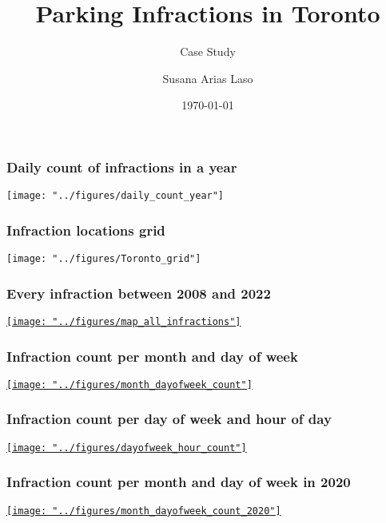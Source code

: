 \documentclass[fleqn]{beamer}
\title[]{Parking Infractions in Toronto}
\subtitle[]{Case Study}
\author[]{Susana Arias Laso}
\date{\today}
\begin{document}
\begin{frame}
  \titlepage

 
\end{frame}

\begin{frame}
\frametitle{Daily count of infractions in a year}
  \centering
  \texttt{[image: "../figures/daily\_count\_year"]}
\end{frame}

\begin{frame}
\end{frame}

\begin{frame}
  \frametitle{Infraction locations grid}
  \centering
  \texttt{[image: "../figures/Toronto\_grid"]}
\end{frame}

\begin{frame}
  \frametitle{Every infraction between 2008 and 2022}
  \centering
  \href{https://sariaslaso.github.io/parking_toronto/figures/all_infractions.html}{\texttt{[image: "../figures/map\_all\_infractions"]}}
\end{frame}

\begin{frame}
  \frametitle{Infraction count per month and day of week}
  \centering
  \href{https://sariaslaso.github.io/parking_toronto/figures/month_dayofweek_count.html}{\texttt{[image: "../figures/month\_dayofweek\_count"]}}
\end{frame}

\begin{frame}
  \frametitle{Infraction count per day of week and hour of day}
  \centering
  \href{https://sariaslaso.github.io/parking_toronto/figures/dayofweek_hour_count.html}{\texttt{[image: "../figures/dayofweek\_hour\_count"]}} 
\end{frame}

\begin{frame}
  \frametitle{Infraction count per month and day of week in 2020}
  \centering
  \href{https://sariaslaso.github.io/parking_toronto/figures/month_dayofweek_count_2020.html}{\texttt{[image: "../figures/month\_dayofweek\_count\_2020"]}} 
\end{frame}
\end{document}

